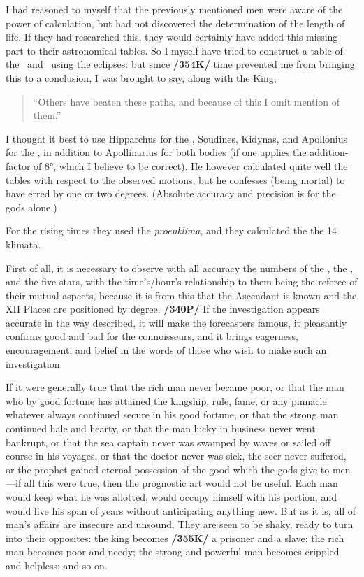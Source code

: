 I had reasoned to myself that the previously mentioned men were aware of the power of calculation, but had not discovered the determination of the length of life. If they had researched this, they would certainly have added this missing part to their astronomical tables. So I myself have tried to construct a table of the \Sun\, and \Moon\, using the eclipses: but since \textbf{/354K/} time prevented me from bringing this to a conclusion, I was brought to say, along with the King, 
\begin{quote}
“Others have beaten these paths, and because of this I omit mention of them.” 
\end{quote}
I thought it best to use Hipparchus for the \Sun, Soudines, Kidynas, and Apollonius for the \Moon, in addition to Apollinarius for both bodies (if one applies the addition-factor of 8°, which I believe to be correct). He however calculated quite well the tables with respect to the observed motions, but he confesses (being mortal) to have erred by one or two degrees. (Absolute accuracy and precision is for
the gods alone.) 

For the rising times they used the \textit{proenklima}, and they calculated the the 14 klimata.

First of all, it is necessary to observe with all accuracy the numbers of the \Sun, the \Moon, and the five stars, with the time’s/hour’s relationship to them being the referee of their mutual aspects, because it is from this that the Ascendant is known and the XII Places are positioned by degree. \textbf{/340P/} If the investigation appears accurate in the way described, it will make the forecasters famous, it pleasantly confirms good and bad for the connoisseurs, and it brings eagerness, encouragement, and belief in the words of those who wish to make such an investigation.

If it were generally true that the rich man never became poor, or that the man who by good fortune has attained the kingship, rule, fame, or any pinnacle whatever always continued secure in his good fortune, or
that the strong man continued hale and hearty, or that the man lucky in business never went bankrupt, or that the sea captain never was swamped by waves or sailed off course in his voyages, or that the doctor never was sick, the seer never suffered, or the prophet gained eternal possession of the good which the gods give to men—if all this were true, then the prognostic art would not be useful. Each man would keep what he was allotted, would occupy himself with his portion, and would live his span of years without anticipating anything new. But as it is, all of man’s affairs are insecure and unsound. They are seen to be shaky, ready to turn into their opposites: the king becomes \textbf{/355K/} a prisoner and a slave; the rich man becomes poor and needy; the strong and powerful man becomes crippled and helpless; and so on.

